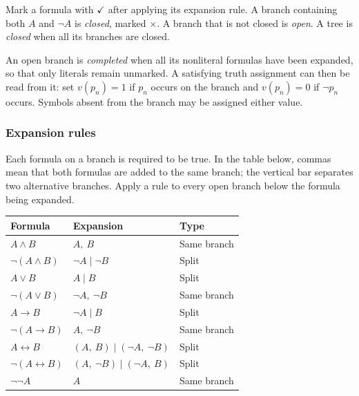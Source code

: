 \documentclass[11pt,a4paper]{amsart}
\begin{document}
\begin{definition}
  Mark a formula with \(\checkmark\) after applying its expansion rule.
  A branch containing both \(A\) and \(\neg A\) is \emph{closed}, marked
  \(\times\). A branch that is not closed is \emph{open}. A tree is
  \emph{closed} when all its branches are closed.

  An open branch is \emph{completed} when all its nonliteral formulas
  have been expanded, so that only literals remain unmarked. A satisfying
  truth assignment can then be read from it: set \(v(p_n)=1\) if \(p_n\)
  occurs on the branch and \(v(p_n)=0\) if \(\neg p_n\) occurs. Symbols
  absent from the branch may be assigned either value.
\end{definition}

\subsubsection{Expansion rules}

Each formula on a branch is required to be true. In the table below,
commas mean that both formulas are added to the same branch; the vertical
bar separates two alternative branches. Apply a rule to every open branch
below the formula being expanded.

\begin{center}
  \renewcommand{\arraystretch}{1.45}
  \begin{tabular}{lll}
    \hline
    Formula & Expansion & Type \\
    \hline
    \(A\land B\) & \(A,\ B\) & Same branch \\
    \(\neg(A\land B)\) & \(\neg A\mid\neg B\) & Split \\
    \(A\lor B\) & \(A\mid B\) & Split \\
    \(\neg(A\lor B)\) & \(\neg A,\ \neg B\) & Same branch \\
    \(A\to B\) & \(\neg A\mid B\) & Split \\
    \(\neg(A\to B)\) & \(A,\ \neg B\) & Same branch \\
    \(A\leftrightarrow B\) & \((A,\ B)\mid(\neg A,\ \neg B)\) & Split \\
    \(\neg(A\leftrightarrow B)\) & \((A,\ \neg B)\mid(\neg A,\ B)\) & Split \\
    \(\neg\neg A\) & \(A\) & Same branch \\
    \hline
  \end{tabular}
\end{center}
\end{document}
